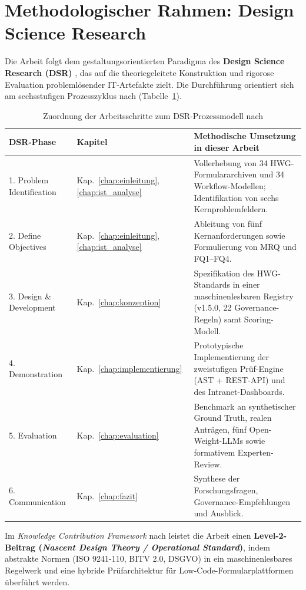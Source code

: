 \section{Methodologischer Rahmen: Design Science Research}
\label{sec:dsr_methodik}

Die Arbeit folgt dem gestaltungsorientierten Paradigma des \textbf{Design Science Research (DSR)} \parencite{hevner2004design, recker2013scientific}, das auf die theoriegeleitete Konstruktion und rigorose Evaluation problemlösender IT-Artefakte zielt. Die Durchführung orientiert sich am sechsstufigen Prozesszyklus nach \textcite{peffers2007design} (Tabelle~\ref{tab:dsr_mapping}).

\begin{table}[htbp]
\centering
\small
\begin{tabularx}{\textwidth}{llX}
\toprule
\textbf{DSR-Phase} & \textbf{Kapitel} & \textbf{Methodische Umsetzung in dieser Arbeit} \\
\midrule
1. Problem Identification & Kap.~\ref{chap:einleitung}, \ref{chap:ist_analyse} & Vollerhebung von 34 HWG-Formulararchiven und 34 Workflow-Modellen; Identifikation von sechs Kernproblemfeldern. \\
2. Define Objectives & Kap.~\ref{chap:einleitung}, \ref{chap:ist_analyse} & Ableitung von fünf Kernanforderungen sowie Formulierung von MRQ und FQ1--FQ4. \\
3. Design \& Development & Kap.~\ref{chap:konzeption} & Spezifikation des HWG-Standards in einer maschinenlesbaren Registry (v1.5.0, 22 Governance-Regeln) samt Scoring-Modell. \\
4. Demonstration & Kap.~\ref{chap:implementierung} & Prototypische Implementierung der zweistufigen Prüf-Engine (AST + REST-API) und des Intranet-Dashboards. \\
5. Evaluation & Kap.~\ref{chap:evaluation} & Benchmark an synthetischer Ground Truth, realen Anträgen, fünf Open-Weight-LLMs sowie formativem Experten-Review. \\
6. Communication & Kap.~\ref{chap:fazit} & Synthese der Forschungsfragen, Governance-Empfehlungen und Ausblick. \\
\bottomrule
\end{tabularx}
\caption{Zuordnung der Arbeitsschritte zum DSR-Prozessmodell nach \textcite{peffers2007design}}
\label{tab:dsr_mapping}
\end{table}

Im \textit{Knowledge Contribution Framework} nach \textcite{gregor2013positioning} leistet die Arbeit einen \textbf{Level-2-Beitrag (\textit{Nascent Design Theory / Operational Standard})}, indem abstrakte Normen (ISO 9241-110, BITV 2.0, DSGVO) in ein maschinenlesbares Regelwerk und eine hybride Prüfarchitektur für Low-Code-Formularplattformen überführt werden.

